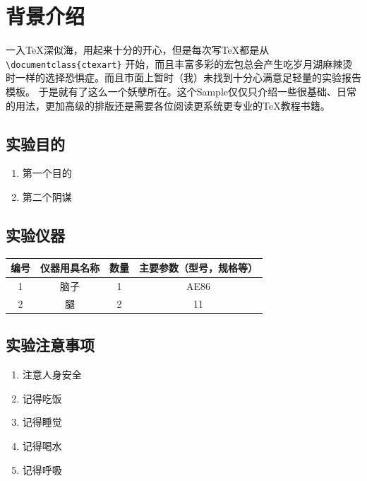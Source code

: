 \documentclass[no-math,zihao = -4]{ctexart} %
\begin{document}
\kaitou %

\section{背景介绍}
    一入\TeX 深似海，用起来十分的开心，但是每次写\TeX 都是从
    \verb|\documentclass{ctexart}|
    开始，而且丰富多彩的宏包总会产生吃岁月湖麻辣烫时一样的选择恐惧症。而且市面上暂时（我）未找到十分心满意足轻量的实验报告模板。
    于是就有了这么一个妖孽所在。这个Sample仅仅只介绍一些很基础、日常的用法，更加高级的排版还是需要各位阅读更系统更专业的\TeX 教程书籍。

    \subsection{实验目的}
        \begin{enumerate}
            \item 第一个目的
            \item 第二个阴谋
        \end{enumerate}

    \subsection{实验仪器}
        \begin{center}
            \begin{tabular}[c]{cccc}
                \toprule
                    编号   &仪器用具名称 &  数量   &主要参数（型号，规格等）\\ 
                \midrule
                    1    & 脑子   & 1 & AE86  \\ 
                    2    & 腿  & 2 & 11 \\ 
                \bottomrule
            \end{tabular}
            \label{tab:实验用具}
        \end{center}

    \subsection{实验注意事项}
        \begin{enumerate}
            \item 注意人身安全
            \item 记得吃饭
            \item 记得睡觉
            \item 记得喝水
            \item 记得呼吸
        \end{enumerate}
\end{document}

